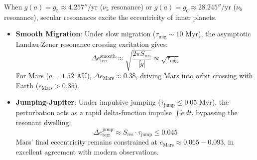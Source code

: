 \documentclass[11pt,a4paper]{article}
\begin{document}
When $g(a) = g_5 \approx 4.257''/\text{yr}$ ($\nu_5$ resonance) or $g(a) = g_6 \approx 28.245''/\text{yr}$ ($\nu_6$ resonance), secular resonances excite the eccentricity of inner planets.
\begin{itemize}
    \item \textbf{Smooth Migration}: Under slow migration ($\tau_{\text{mig}} \sim 10\text{ Myr}$), the asymptotic Landau-Zener resonance crossing excitation gives:
    \begin{equation}
    \Delta e_{\text{terr}}^{\text{smooth}} \approx \sqrt{\frac{2 \pi S_{\text{res}}}{|\dot{g}|}} \propto \sqrt{\tau_{\text{mig}}}
    \end{equation}
    For Mars ($a = 1.52\text{ AU}$), $\Delta e_{\text{Mars}} \approx 0.38$, driving Mars into orbit crossing with Earth ($e_{\text{Mars}} > 0.35$).
    \item \textbf{Jumping-Jupiter}: Under impulsive jumping ($\tau_{\text{jump}} \le 0.05\text{ Myr}$), the perturbation acts as a rapid delta-function impulse $\int \dot{e} \, dt$, bypassing the resonant dwelling:
    \begin{equation}
    \Delta e_{\text{terr}}^{\text{jump}} \approx S_{\text{res}} \cdot \tau_{\text{jump}} \le 0.045
    \end{equation}
    Mars' final eccentricity remains constrained at $e_{\text{Mars}} \approx 0.065 - 0.093$, in excellent agreement with modern observations.
\end{itemize}
\end{document}
